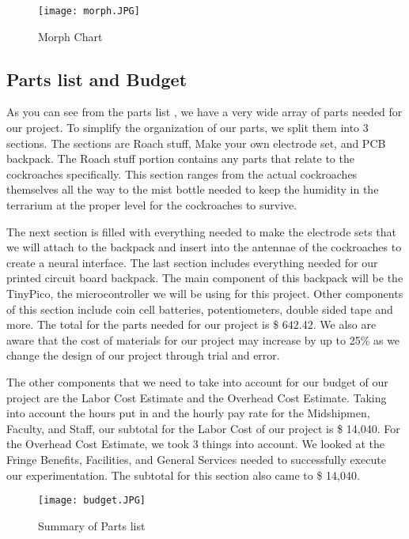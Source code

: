 \documentclass{article}
\begin{document}
\begin{figure}[ht!]
\centering
\texttt{[image: morph.JPG]}
\caption{Morph Chart}
\label{fig:morph}
\end{figure}

\subsection{Parts list and Budget}
As you can see from the parts list , we have a very wide array of parts needed for our project. To simplify the organization of our parts, we split them into 3 sections. The sections are Roach stuff, Make your own electrode set, and PCB backpack. The Roach stuff portion contains any parts that relate to the cockroaches specifically. This section ranges from the actual cockroaches themselves all the way to the mist bottle needed to keep the humidity in the terrarium at the proper level for the cockroaches to survive.



 The next section is filled with everything needed to make the electrode sets that we will attach to the backpack and insert into the antennae of the cockroaches to create a neural interface. The last section includes everything needed for our printed circuit board backpack. The main component of this backpack will be the TinyPico, the microcontroller we will be using for this project. Other components of this section include coin cell batteries, potentiometers, double sided tape and more. The total for the parts needed for our project is \$ 642.42. We also are aware that the  cost of materials for our project may increase by up to 25\% as we change the design of our project through trial and error.



 The other components that we need to take into account for our budget of our project are the Labor Cost Estimate and the Overhead Cost Estimate.  Taking into account the hours put in and the hourly pay rate for the Midshipmen, Faculty, and Staff, our subtotal for the Labor Cost of our project is \$ 14,040. For the Overhead Cost Estimate, we took 3 things into account. We looked at the Fringe Benefits, Facilities, and General Services needed to successfully execute our experimentation. The subtotal for this section also came to \$ 14,040.

\begin{figure}
\centering
\texttt{[image: budget.JPG]}
\caption{Summary of Parts list}
\label{fig:budget}
\end{figure}
\end{document}
